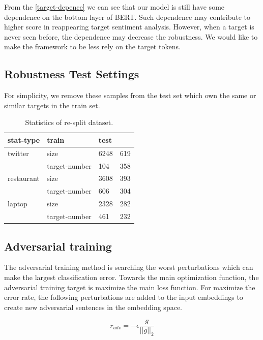\documentclass[fyp]{socreport}
\begin{document}
From the \ref{target-depence} we can see that our model is still have some dependence on the bottom layer of BERT. Such dependence may contribute to higher score in reappearing target sentiment analysis. However, when a target is never seen before, the dependence may decrease the robustness. We would like to make the framework to be less rely on the target tokens.

\subsection{Robustness Test Settings}
For simplicity, we remove these samples from the test set which own the same or similar targets in the train set.

\begin{table}[]
    \centering
    \caption{
		Statistics of re-split dataset.\\
	}
    \begin{tabular}{llll}
    \hline
    stat-type  & train         & test &     \\ \hline
    twitter    & size          & 6248 & 619 \\ \hline
               & target-number & 104  & 358 \\ \hline
    restaurant & size          & 3608 & 393 \\ \hline
               & target-number & 606  & 304 \\ \hline
    laptop     & size          & 2328 & 282 \\ \hline
               & target-number & 461  & 232 \\ \hline
    \end{tabular}
\end{table}

\subsection{Adversarial training}
The adversarial training method is searching the worst perturbations which can make the largest classification error. Towards the main optimization function, the adversarial training target is maximize the main loss function. For maximize the error rate, the following perturbations are added to the input embeddings to create new adversarial sentences in the embedding space. 

\begin{equation}
r_{adv} = -\epsilon \frac{g}{||g||_2}
\end{equation} 
\end{document}
